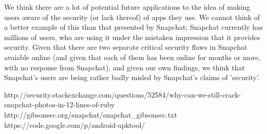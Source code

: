 \documentclass[11pt]{article}
\numberwithin{theorem}{subsection}
\begin{document}
We think there are a lot of potential future applications to the idea of making users aware of the security (or lack thereof) of apps they use.  We
cannot think of a better example of this than that presented by Snapchat; Snapchat currently has millions of users, who are using it under the
mistaken impression that it provides security.  Given that there are two separate critical security flaws in Snapchat avaiable online (and given that
each of them has been online for months or more, with no response from Snapchat), and given our own findings, we think that Snapchat's users are being
rather badly misled by Snapchat's claims of 'security'.

\begin{thebibliography}{9}

        http://security.stackexchange.com/questions/52584/why-can-we-still-crack-snapchat-photos-in-12-lines-of-ruby
        http://gibsonsec.org/snapchat/snapchat_gibsonsec.txt
        https://code.google.com/p/android-apktool/

\end{thebibliography}
\end{document}
